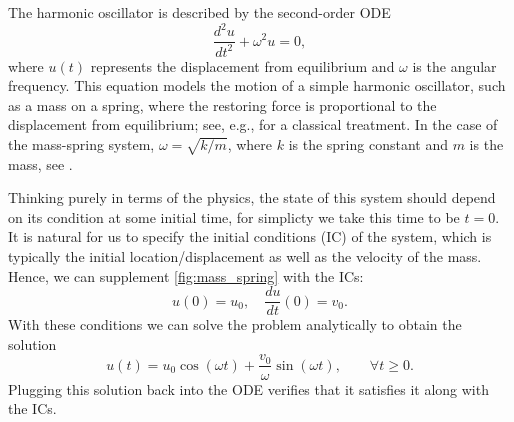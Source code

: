 \begin{example}\label{ex:harmonic_oscillator}
    The harmonic oscillator is described by the second-order ODE
    \begin{equation}\label{eq:mass_spring}
        \frac{d^2 u}{dt^2} + \omega^2 u = 0,
    \end{equation}
    where $u(t)$ represents the displacement from equilibrium and $\omega$ is the angular frequency. 
    This equation models the motion of a simple harmonic oscillator, such as a mass on a spring, where the restoring force is proportional to
    the displacement from equilibrium; see, e.g., 
    \cite[Ch.~5]{taylor2005classical} for a classical treatment. 
    In the case of the mass-spring system, $\omega = \sqrt{k/m}$,
    where $k$ is the spring constant and $m$ is the mass, 
    see .

    Thinking purely in terms of the physics, the state of this 
    system should depend on its condition at some initial time, 
    for simplicty we take this time to be $t=0$. It is 
    natural for us to specify the initial conditions (IC) of the 
    system, which is typically the initial location/displacement
    as well as the velocity of the mass. Hence, we can supplement 
    \eqref{fig:mass_spring} with the ICs: 
    \begin{equation*}
        u(0) = u_0, \quad \frac{du}{dt}(0) = v_0.
    \end{equation*}
    With these conditions we can solve the problem analytically to 
    obtain the solution 
    \begin{equation}\label{eq:harmonic_oscillator_solution}
        u(t) = u_0 \cos(\omega t) + \frac{v_0}{\omega} \sin(\omega t), \qquad 
        \forall t \ge 0.
    \end{equation}
    Plugging this solution back into the ODE verifies that 
    it satisfies it along with the ICs. 

    \begin{figure}[htp]
        \centering
\end{figure}
\end{example}
